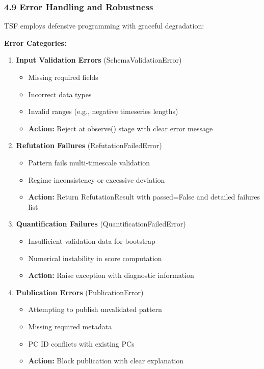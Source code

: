 \documentclass[
]{article}
\providecommand{\tightlist}{%
  \setlength{\itemsep}{0pt}\setlength{\parskip}{0pt}}
\begin{document}
\subsubsection{4.9 Error Handling and
Robustness}\label{error-handling-and-robustness}

TSF employs defensive programming with graceful degradation:

\textbf{Error Categories:}

\begin{enumerate}
\def\labelenumi{\arabic{enumi}.}
\tightlist
\item
  \textbf{Input Validation Errors} (SchemaValidationError)

  \begin{itemize}
  \tightlist
  \item
    Missing required fields
  \item
    Incorrect data types
  \item
    Invalid ranges (e.g., negative timeseries lengths)
  \item
    \textbf{Action:} Reject at observe() stage with clear error message
  \end{itemize}
\item
  \textbf{Refutation Failures} (RefutationFailedError)

  \begin{itemize}
  \tightlist
  \item
    Pattern fails multi-timescale validation
  \item
    Regime inconsistency or excessive deviation
  \item
    \textbf{Action:} Return RefutationResult with passed=False and
    detailed failures list
  \end{itemize}
\item
  \textbf{Quantification Failures} (QuantificationFailedError)

  \begin{itemize}
  \tightlist
  \item
    Insufficient validation data for bootstrap
  \item
    Numerical instability in score computation
  \item
    \textbf{Action:} Raise exception with diagnostic information
  \end{itemize}
\item
  \textbf{Publication Errors} (PublicationError)

  \begin{itemize}
  \tightlist
  \item
    Attempting to publish unvalidated pattern
  \item
    Missing required metadata
  \item
    PC ID conflicts with existing PCs
  \item
    \textbf{Action:} Block publication with clear explanation
  \end{itemize}
\end{enumerate}
\end{document}
